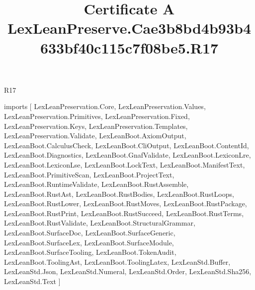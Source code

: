 \begin{lexlean}{R17}
\title{Certificate A LexLeanPreserve.Cae3b8bd4b93b4633bf40c115c7f08be5.R17}
\begin{coremodule}
imports [
  LexLeanPreservation.Core,
  LexLeanPreservation.Values,
  LexLeanPreservation.Primitives,
  LexLeanPreservation.Fixed,
  LexLeanPreservation.Keys,
  LexLeanPreservation.Templates,
  LexLeanPreservation.Validate,
  LexLeanBoot.AxiomOutput,
  LexLeanBoot.CalculusCheck,
  LexLeanBoot.CliOutput,
  LexLeanBoot.ContentId,
  LexLeanBoot.Diagnostics,
  LexLeanBoot.GnafValidate,
  LexLeanBoot.LexiconLre,
  LexLeanBoot.LexiconLse,
  LexLeanBoot.LockText,
  LexLeanBoot.ManifestText,
  LexLeanBoot.PrimitiveScan,
  LexLeanBoot.ProjectText,
  LexLeanBoot.RuntimeValidate,
  LexLeanBoot.RustAssemble,
  LexLeanBoot.RustAst,
  LexLeanBoot.RustBodies,
  LexLeanBoot.RustLoops,
  LexLeanBoot.RustLower,
  LexLeanBoot.RustMoves,
  LexLeanBoot.RustPackage,
  LexLeanBoot.RustPrint,
  LexLeanBoot.RustSucceed,
  LexLeanBoot.RustTerms,
  LexLeanBoot.RustValidate,
  LexLeanBoot.StructuralGrammar,
  LexLeanBoot.SurfaceDoc,
  LexLeanBoot.SurfaceGeneric,
  LexLeanBoot.SurfaceLex,
  LexLeanBoot.SurfaceModule,
  LexLeanBoot.SurfaceTooling,
  LexLeanBoot.TokenAudit,
  LexLeanBoot.ToolingAst,
  LexLeanBoot.ToolingLatex,
  LexLeanStd.Buffer,
  LexLeanStd.Json,
  LexLeanStd.Numeral,
  LexLeanStd.Order,
  LexLeanStd.Sha256,
  LexLeanStd.Text
]


\end{coremodule}
\end{lexlean}
